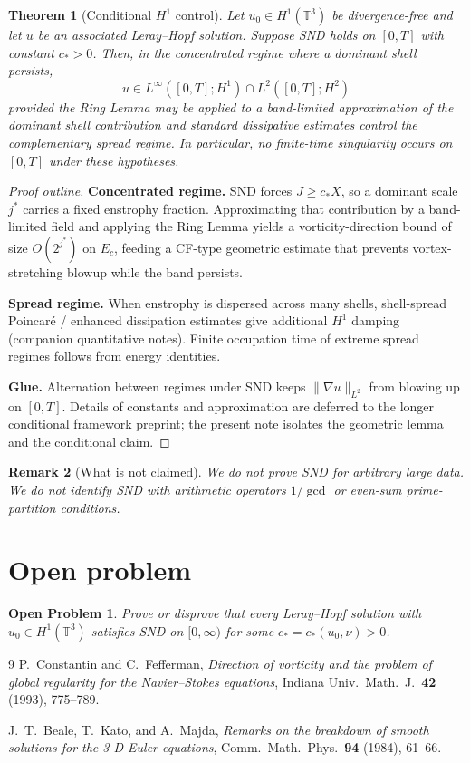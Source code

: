 \documentclass[11pt]{article}
\newtheorem{theorem}{Theorem}[section]
\newtheorem{remark}[theorem]{Remark}
\newtheorem*{openproblem}{Open Problem}
\begin{document}
\begin{theorem}[Conditional $H^1$ control]
Let $u_0\in H^1(\mathbb{T}^3)$ be divergence-free and let $u$ be an associated
Leray--Hopf solution. Suppose SND holds on $[0,T]$ with constant $c_*>0$. Then, in the
concentrated regime where a dominant shell persists,
\[
u\in L^\infty([0,T];H^1)\cap L^2([0,T];H^2)
\]
provided the Ring Lemma may be applied to a band-limited approximation of the dominant
shell contribution and standard dissipative estimates control the complementary spread
regime. In particular, no finite-time singularity occurs on $[0,T]$ under these
hypotheses.
\end{theorem}

\begin{proof}[Proof outline]
\textbf{Concentrated regime.} SND forces $J\ge c_*X$, so a dominant scale $j^*$ carries a
fixed enstrophy fraction. Approximating that contribution by a band-limited field and
applying the Ring Lemma yields a vorticity-direction bound of size $O(2^{j^*})$ on $E_c$,
feeding a CF-type geometric estimate that prevents vortex-stretching blowup while the
band persists.

\textbf{Spread regime.} When enstrophy is dispersed across many shells, shell-spread
Poincar\'e / enhanced dissipation estimates give additional $H^1$ damping
(companion quantitative notes). Finite occupation time of extreme spread regimes follows
from energy identities.

\textbf{Glue.} Alternation between regimes under SND keeps $\|\nabla u\|_{L^2}$ from
blowing up on $[0,T]$. Details of constants and approximation are deferred to the longer
conditional framework preprint; the present note isolates the geometric lemma and the
conditional claim.
\end{proof}

\begin{remark}[What is not claimed]
We do \emph{not} prove SND for arbitrary large data.
We do not identify SND with arithmetic operators $1/\gcd$ or even-sum
prime-partition conditions.
\end{remark}

\section{Open problem}

\begin{openproblem}
Prove or disprove that every Leray--Hopf solution with $u_0\in H^1(\mathbb{T}^3)$
satisfies SND on $[0,\infty)$ for some $c_*=c_*(u_0,\nu)>0$.
\end{openproblem}

\begin{thebibliography}{9}
P.~Constantin and C.~Fefferman,
\textit{Direction of vorticity and the problem of global regularity for the
Navier--Stokes equations},
Indiana Univ.\ Math.\ J.\ \textbf{42} (1993), 775--789.

J.~T.~Beale, T.~Kato, and A.~Majda,
\textit{Remarks on the breakdown of smooth solutions for the 3-D Euler equations},
Comm.\ Math.\ Phys.\ \textbf{94} (1984), 61--66.
\end{thebibliography}
\end{document}
